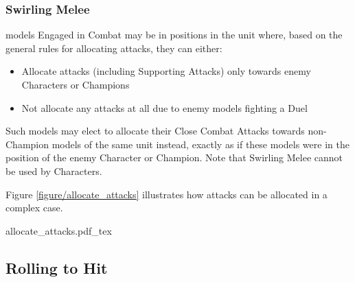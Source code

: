 \subsubsection{Swirling Melee}
\label{swirling_melee}

\rnf{} models Engaged in Combat may be in positions in the unit where, based on the general rules for allocating attacks, they can either:
\begin{itemize}
\item Allocate attacks (including Supporting Attacks) only towards enemy Characters or Champions
\item Not allocate any attacks at all due to enemy models fighting a Duel
\end{itemize}
Such models may elect to allocate their Close Combat Attacks towards non-Champion \rnf{} models of the same unit instead, exactly as if these \rnf{} models were in the position of the enemy Character or Champion. Note that Swirling Melee cannot be used by Characters.

Figure \ref{figure/allocate_attacks} illustrates how attacks can be allocated in a complex case.

\newcommand{\figAHCharOne}{$C_{1} $}
\newcommand{\figAHCharTwo}{$C_{2} $}
\newcommand{\figAHCharThree}{$C_{3} $}
\newcommand{\figAHChamp}{Ch}

\begin{Figure}
	\Fanchor
	\centering
	\def\svgwidth{0.95\columnwidth}
	{allocate_attacks.pdf_tex}
	\caption{Example for allocating attacks.\captionposttitle
		The Champion of unit B (Ch) and Character $C_{2} $ are locked in a Duel (indicated by the chess pattern). This means that they can only allocate attacks towards each other. The magenta and green models can allocate attacks towards the \rnf{} models of the other unit. The models with a bold frame can allocate attacks towards Characters/Champions. The models in fainter colours with dashed frames cannot attack at all. Character $C_{1} $ cannot attack because the only model it is in base contact with is a Champion that is locked in a Duel. If $C_{1} $ was a \rnf{} model, it could allocate attacks towards the magenta \rnf{} models.%
	}
	\label{figure/allocate_attacks}
\end{Figure}

\subsection{Rolling to Hit}
\label{rolling_to_hit}

